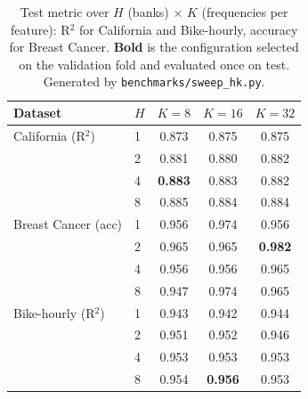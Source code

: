 \documentclass[11pt]{article}
\theoremstyle{definition}
\begin{document}
\begin{table}[t]\centering
\caption{Test metric over $H$ (banks) $\times$ $K$ (frequencies per feature): R$^2$ for California
and Bike-hourly, accuracy for Breast Cancer. \textbf{Bold} is the configuration selected on the
validation fold and evaluated once on test. Generated by \texttt{benchmarks/sweep\_hk.py}.}
\label{tab:sweep}
\begin{tabular}{llccc}
\toprule
Dataset & $H$ & $K{=}8$ & $K{=}16$ & $K{=}32$ \\
\midrule
California (R$^2$)   & 1 & 0.873          & 0.875          & 0.875 \\
                     & 2 & 0.881          & 0.880          & 0.882 \\
                     & 4 & \textbf{0.883} & 0.883          & 0.882 \\
                     & 8 & 0.885          & 0.884          & 0.884 \\
\midrule
Breast Cancer (acc)  & 1 & 0.956          & 0.974          & 0.956 \\
                     & 2 & 0.965          & 0.965          & \textbf{0.982} \\
                     & 4 & 0.956          & 0.956          & 0.965 \\
                     & 8 & 0.947          & 0.974          & 0.965 \\
\midrule
Bike-hourly (R$^2$)  & 1 & 0.943          & 0.942          & 0.944 \\
                     & 2 & 0.951          & 0.952          & 0.946 \\
                     & 4 & 0.953          & 0.953          & 0.953 \\
                     & 8 & 0.954          & \textbf{0.956} & 0.953 \\
\bottomrule
\end{tabular}
\end{table}
\end{document}
